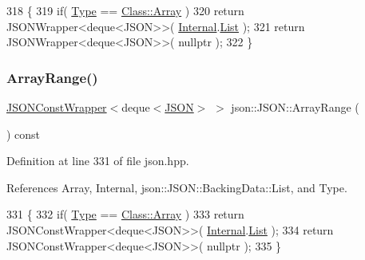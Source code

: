 \begin{DoxyCode}
318                                               \{
319             \textcolor{keywordflow}{if}( \mbox{\hyperlink{classjson_1_1_j_s_o_n_a3fa6923afa41bdfe38077fbc0079aaf5}{Type}} == \mbox{\hyperlink{classjson_1_1_j_s_o_n_a762f55df6d407c1af61607ed516ffe07a4410ec34d9e6c1a68100ca0ce033fb17}{Class::Array}} )
320                 \textcolor{keywordflow}{return} JSONWrapper<deque<JSON>>( \mbox{\hyperlink{classjson_1_1_j_s_o_n_a1e2a064794c3d55c8bb8887fc5734947}{Internal}}.\mbox{\hyperlink{unionjson_1_1_j_s_o_n_1_1_backing_data_ab85f5e7ad21f9f7a5407ab73128a3ebc}{List}} );
321             \textcolor{keywordflow}{return} JSONWrapper<deque<JSON>>( nullptr );
322         \}
\end{DoxyCode}
\mbox{\label{classjson_1_1_j_s_o_n_a7e57080ed10b2903c792146f81bf90eb}} 
\subsubsection{\texorpdfstring{Array\+Range()}{ArrayRange()}\hspace{0.1cm}{\footnotesize\ttfamily [2/2]}}
{\footnotesize\ttfamily \mbox{\hyperlink{classjson_1_1_j_s_o_n_1_1_j_s_o_n_const_wrapper}{J\+S\+O\+N\+Const\+Wrapper}}$<$deque$<$\mbox{\hyperlink{classjson_1_1_j_s_o_n}{J\+S\+ON}}$>$ $>$ json\+::\+J\+S\+O\+N\+::\+Array\+Range (\begin{DoxyParamCaption}{ }\end{DoxyParamCaption}) const\hspace{0.3cm}{\ttfamily [inline]}}



Definition at line 331 of file json.\+hpp.



References Array, Internal, json\+::\+J\+S\+O\+N\+::\+Backing\+Data\+::\+List, and Type.


\begin{DoxyCode}
331                                                          \{ 
332             \textcolor{keywordflow}{if}( \mbox{\hyperlink{classjson_1_1_j_s_o_n_a3fa6923afa41bdfe38077fbc0079aaf5}{Type}} == \mbox{\hyperlink{classjson_1_1_j_s_o_n_a762f55df6d407c1af61607ed516ffe07a4410ec34d9e6c1a68100ca0ce033fb17}{Class::Array}} )
333                 \textcolor{keywordflow}{return} JSONConstWrapper<deque<JSON>>( \mbox{\hyperlink{classjson_1_1_j_s_o_n_a1e2a064794c3d55c8bb8887fc5734947}{Internal}}.\mbox{\hyperlink{unionjson_1_1_j_s_o_n_1_1_backing_data_ab85f5e7ad21f9f7a5407ab73128a3ebc}{List}} );
334             \textcolor{keywordflow}{return} JSONConstWrapper<deque<JSON>>( nullptr );
335         \}
\end{DoxyCode}
\mbox{\label{classjson_1_1_j_s_o_n_a0980eee524bf7442d5f00612984c89c4}} 

